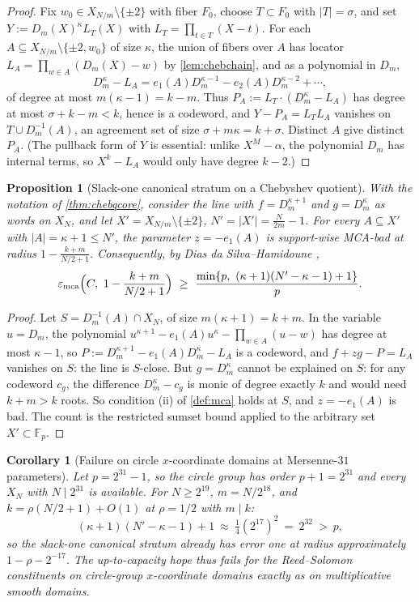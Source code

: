 \documentclass[11pt]{article}
\newtheorem{proposition}[proposition]{Proposition}
\newtheorem{corollary}[corollary]{Corollary}
\theoremstyle{definition}
\newcommand{\F}{\mathbb F}
\newcommand{\eps}{\varepsilon}
\newcommand{\emca}{\eps_{\rm mca}}
\begin{document}
\begin{proof}
Fix $w_0\in X_{N/m}\setminus\{\pm2\}$ with fiber $F_0$, choose $T\subset F_0$ with $|T|=\sigma$, and set $Y:=D_m(X)^{\kappa}L_T(X)$ with $L_T=\prod_{t\in T}(X-t)$.  For each $A\subseteq X_{N/m}\setminus\{\pm2,w_0\}$ of size $\kappa$, the union of fibers over $A$ has locator $L_A=\prod_{w\in A}(D_m(X)-w)$ by \cref{lem:chebchain}, and as a polynomial in $D_m$,
\[
        D_m^{\kappa}-L_A=e_1(A)D_m^{\kappa-1}-e_2(A)D_m^{\kappa-2}+\cdots,
\]
of degree at most $m(\kappa-1)=k-m$.  Thus $P_A:=L_T\cdot(D_m^\kappa-L_A)$ has degree at most $\sigma+k-m<k$, hence is a codeword, and $Y-P_A=L_TL_A$ vanishes on $T\cup D_m^{-1}(A)$, an agreement set of size $\sigma+m\kappa=k+\sigma$.  Distinct $A$ give distinct $P_A$.  (The pullback form of $Y$ is essential: unlike $X^M-\alpha$, the polynomial $D_m$ has internal terms, so $X^k-L_A$ would only have degree $k-2$.)
\end{proof}

\begin{proposition}[Slack-one canonical stratum on a Chebyshev quotient]\label{prop:chebslack}
With the notation of \cref{thm:chebqcore}, consider the line with $f=D_m^{\kappa+1}$ and $g=D_m^{\kappa}$ as words on $X_N$, and let $X'=X_{N/m}\setminus\{\pm2\}$, $N'=|X'|=\frac N{2m}-1$.  For every $A\subseteq X'$ with $|A|=\kappa+1\le N'$, the parameter $z=-e_1(A)$ is support-wise MCA-bad at radius $1-\frac{k+m}{N/2+1}$.  Consequently, by Dias da Silva--Hamidoune \cite{DH94},
\[
        \emca\Big(C,\ 1-\frac{k+m}{N/2+1}\Big)\ \ge\ \frac{\min\{p,\ (\kappa+1)(N'-\kappa-1)+1\}}{p}.
\]
\end{proposition}

\begin{proof}
Let $S=D_m^{-1}(A)\cap X_N$, of size $m(\kappa+1)=k+m$.  In the variable $u=D_m$, the polynomial $u^{\kappa+1}-e_1(A)u^{\kappa}-\prod_{w\in A}(u-w)$ has degree at most $\kappa-1$, so $P:=D_m^{\kappa+1}-e_1(A)D_m^{\kappa}-L_A$ is a codeword, and $f+zg-P=L_A$ vanishes on $S$: the line is $S$-close.  But $g=D_m^\kappa$ cannot be explained on $S$: for any codeword $c_g$, the difference $D_m^\kappa-c_g$ is monic of degree exactly $k$ and would need $k+m>k$ roots.  So condition (ii) of \cref{def:mca} holds at $S$, and $z=-e_1(A)$ is bad.  The count is the restricted sumset bound applied to the arbitrary set $X'\subset\F_p$.
\end{proof}

\begin{corollary}[Failure on circle $x$-coordinate domains at Mersenne-$31$ parameters]\label{cor:circle}
Let $p=2^{31}-1$, so the circle group has order $p+1=2^{31}$ and every $X_N$ with $N\mid 2^{31}$ is available.  For $N\ge2^{19}$, $m=N/2^{18}$, and $k=\rho(N/2+1)+O(1)$ at $\rho=1/2$ with $m\mid k$:
\[
        (\kappa+1)(N'-\kappa-1)+1\ \approx\ \tfrac14(2^{17})^2\ =\ 2^{32}\ >\ p,
\]
so the slack-one canonical stratum already has error one at radius approximately $1-\rho-2^{-17}$.  The up-to-capacity hope thus fails for the Reed--Solomon constituents on circle-group $x$-coordinate domains exactly as on multiplicative smooth domains.
\end{corollary}
\end{document}
